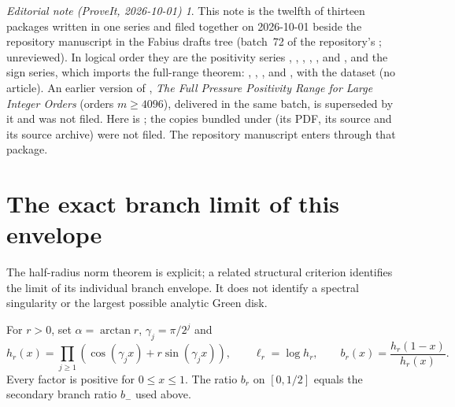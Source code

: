 \documentclass[11pt,a4paper]{article}
\theoremstyle{remark}\newtheorem*{ednote}{Editorial note (ProveIt, 2026-10-01)}
\begin{document}
\begin{ednote}
This note is the twelfth of thirteen packages written in one series and filed together on 2026-10-01 beside the repository manuscript  in the Fabius drafts tree (batch~72 of the repository's ; unreviewed). In logical order they are the positivity series , , , , ,  and , and the sign series, which imports the full-range theorem: , , ,  and , with the dataset  (no article). An earlier version of , \emph{The Full Pressure Positivity Range for Large Integer Orders} (orders $m\ge4096$), delivered in the same batch, is superseded by it and was not filed.
Here \cite{First} is ; the copies bundled under 
(its PDF, its source and its source archive) were not filed. The repository manuscript enters
through that package.
\end{ednote}

\appendix
\section{The exact branch limit of this envelope}
The half-radius norm theorem is explicit; a related structural criterion identifies the limit of its individual branch envelope. It does not identify a spectral singularity or the largest possible analytic Green disk.

For $r>0$, set $\alpha=\arctan r$, $\gamma_j=\pi/2^j$ and
\[
 h_r(x)=\prod_{j\ge1}(\cos(\gamma_jx)+r\sin(\gamma_jx)),\qquad
 \ell_r=\log h_r,\qquad b_r(x)=\frac{h_r(1-x)}{h_r(x)}.
\]
Every factor is positive for $0\le x\le1$. The ratio $b_r$ on $[0,1/2]$ equals the secondary branch ratio $b_-$ used above.
\end{document}
